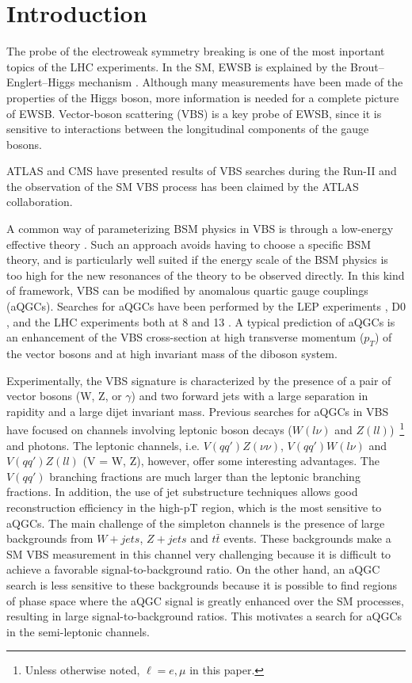 \chapter{Introduction}
The probe of the electroweak symmetry breaking is one of the most inportant topics of the LHC experiments.
In the SM, EWSB is explained by the Brout–Englert–Higgs mechanism \cite{}. 
Although many measurements have been made of the properties of the Higgs boson, more information is needed for a complete picture of EWSB. Vector-boson scattering (VBS) is a key probe of EWSB, since it is sensitive to interactions between the longitudinal components of the gauge bosons.

ATLAS and CMS have presented results of VBS searches during the Run-II \cite{STDM-2017-19,CMS-SMP-20-001} and the observation of the SM VBS process has been claimed by the ATLAS collaboration.

A common way of parameterizing BSM physics in VBS is through a low-energy effective theory \cite{Longhitano:1980tm}. Such an approach avoids having to choose a specific BSM theory, and is particularly well suited if the energy scale of the BSM physics is too high for the new resonances of the theory to be observed directly. In this kind of framework, VBS can be modified by anomalous quartic gauge couplings (aQGCs). Searches for aQGCs have been performed by the LEP experiments \cite{delphi1, L3_1, L3_2, opal1, opal2, opal3}, D0 \cite{d0aQGC}, and the LHC experiments both at 8 \TeV
\cite{STDM-2013-06,STDM-2013-05,STDM-2014-02, STDM-2014-01, STDM-2014-05, STDM-2015-07,
STDM-2015-09, CMS-SMP-13-009, CMS-SMP-13-015, CMS-FSQ-13-008}
and 13 \TeV
\cite{STDM-2017-23, STDM-2017-24, STDM-2017-20, STDM-2017-06, STDM-2017-26, STDM-2017-19}
.
A typical prediction of aQGCs is an enhancement of the VBS cross-section at high transverse momentum ($p_T$) of the vector bosons and at high invariant mass of the diboson system.

Experimentally, the VBS signature is characterized by the presence of a pair of vector bosons (W, Z, or $\gamma$) and two forward jets with a large separation in rapidity and a large dijet invariant mass. Previous searches for aQGCs in VBS have focused on channels involving leptonic boson decays ($W(l\nu)$ and $Z(ll)$)~\footnote{Unless otherwise noted, $\ell=e,\mu$ in this paper.} and photons.
The leptonic channels, i.e. $V(qq')Z(\nu\nu)$, $V(qq')W(l\nu)$ and $V(qq')Z(ll)$ (V = W, Z), however, offer some interesting advantages. The $V(qq')$ branching fractions are much larger than the leptonic branching fractions. In addition, the use of jet substructure techniques allows good reconstruction efficiency in the high-pT region, which is the most sensitive to aQGCs.
The main challenge of the simpleton channels is the presence of large backgrounds from $W + jets$, $Z + jets$ and $t\bar{t}$ events. These backgrounds make a SM VBS measurement in this channel very challenging because it is difficult to achieve a favorable signal-to-background ratio. On the other hand, an aQGC search is less sensitive to these backgrounds because it is possible to find regions of phase space where the aQGC signal is greatly enhanced over the SM processes, resulting in large signal-to-background ratios. This motivates a search for aQGCs in the semi-leptonic channels.

